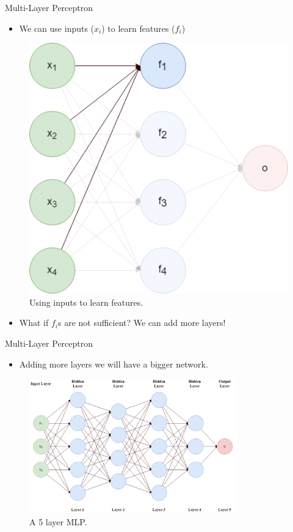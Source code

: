 \begin{frame}{Multi-Layer Perceptron}
    \begin{itemize}
        \item We can use inputs ($x_i$) to learn features ($f_i$)
    \end{itemize}
    \begin{figure}[H]
        \centering
        \includegraphics[height=0.45\textheight]{Figs/learn_features.png}
        \caption{Using inputs to learn features.}
    \end{figure}
    \begin{itemize}
        \item What if $f_i$s are not sufficient? We can add more layers!
    \end{itemize}
\end{frame}

\begin{frame}{Multi-Layer Perceptron}
    \begin{itemize}
        \item Adding more layers we will have a bigger network.
    \end{itemize}
    \begin{figure}[H]
        \centering
        \includegraphics[width=0.8\textwidth]{Figs/5layer_mlp.png}
        \caption{A 5 layer MLP.}
    \end{figure}
\end{frame}


